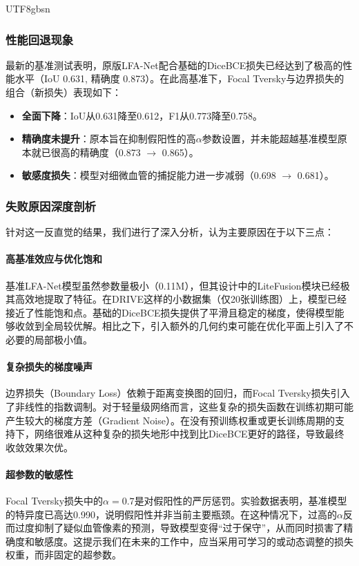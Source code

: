 \documentclass[conference]{IEEEtran}
\begin{document}
\begin{CJK}{UTF8}{gbsn}
\subsubsection{性能回退现象}
最新的基准测试表明，原版LFA-Net配合基础的DiceBCE损失已经达到了极高的性能水平（IoU 0.631, 精确度 0.873）。在此高基准下，Focal Tversky与边界损失的组合（新损失）表现如下：
\begin{itemize}
    \item \textbf{全面下降}：IoU从0.631降至0.612，F1从0.773降至0.758。
    \item \textbf{精确度未提升}：原本旨在抑制假阳性的高$\alpha$参数设置，并未能超越基准模型原本就已很高的精确度（0.873 $\rightarrow$ 0.865）。
    \item \textbf{敏感度损失}：模型对细微血管的捕捉能力进一步减弱（0.698 $\rightarrow$ 0.681）。
\end{itemize}

\subsubsection{失败原因深度剖析}
针对这一反直觉的结果，我们进行了深入分析，认为主要原因在于以下三点：

\paragraph{高基准效应与优化饱和}
基准LFA-Net模型虽然参数量极小（0.11M），但其设计中的LiteFusion模块已经极其高效地提取了特征。在DRIVE这样的小数据集（仅20张训练图）上，模型已经接近了性能饱和点。基础的DiceBCE损失提供了平滑且稳定的梯度，使得模型能够收敛到全局较优解。相比之下，引入额外的几何约束可能在优化平面上引入了不必要的局部极小值。

\paragraph{复杂损失的梯度噪声}
边界损失（Boundary Loss）依赖于距离变换图的回归，而Focal Tversky损失引入了非线性的指数调制。对于轻量级网络而言，这些复杂的损失函数在训练初期可能产生较大的梯度方差（Gradient Noise）。在没有预训练权重或更长训练周期的支持下，网络很难从这种复杂的损失地形中找到比DiceBCE更好的路径，导致最终收敛效果次优。

\paragraph{超参数的敏感性}
Focal Tversky损失中的$\alpha=0.7$是对假阳性的严厉惩罚。实验数据表明，基准模型的特异度已高达0.990，说明假阳性并非当前主要瓶颈。在这种情况下，过高的$\alpha$反而过度抑制了疑似血管像素的预测，导致模型变得“过于保守”，从而同时损害了精确度和敏感度。这提示我们在未来的工作中，应当采用可学习的或动态调整的损失权重，而非固定的超参数。



\end{CJK}
\end{document}
